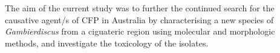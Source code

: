 \documentclass[12pt]{article}
\begin{document}
The aim of the current study was to further the continued search for the causative agent/s of CFP in Australia by characterising a new species of \emph{Gambierdiscus} from a ciguateric region using molecular and morphologic methods, and investigate the toxicology of the isolates.






\end{document}
